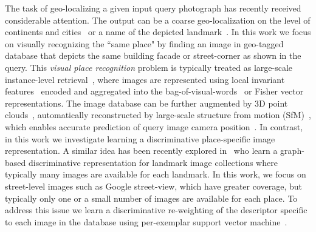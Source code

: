                        
                       
    
		\textcolor{petr}{
	The task of geo-localizing a given input query photograph has recently received considerable attention.  
	  The output can be a coarse geo-localization on the level of continents and cities~\cite{Doersch12,Hays2008,Kalogerakis09} or a name of the depicted landmark~\cite{Li09}.  In this work we focus on visually recognizing the ``same place" by finding an image in geo-tagged database that depicts the same building facade or street-corner as shown in the query.}  	  
    This {\em visual place recognition} problem is typically treated as large-scale instance-level retrieval~\cite{Cummins09,Chen11,Knopp2010,Schindler07,Torii2013,Zamir10}, where images are represented using local invariant features~\cite{Lowe04} encoded and aggregated into the bag-of-visual-words~\cite{Csurka04,Sivic03} or Fisher vector~\cite{Jegou12} representations. 
    The image database can be further augmented by 3D point clouds~\cite{Klinger13}, automatically
    reconstructed by large-scale structure from motion
    (SfM)~\cite{Agarwal-ICCV-2009,Klinger13}, which enables accurate prediction of query image camera position~\cite{Li12,Sattler12}.
    In contrast, in this work we investigate learning a discriminative place-specific image representation. A similar idea has been recently explored in~\cite{Cao13} 
    who learn a graph-based discriminative representation for landmark image collections where typically many images are available for each landmark.
    In this work, we focus on street-level images such as Google street-view, which have greater coverage, but typically only one or a small number of images are  available for each place.  To address this issue we learn a discriminative re-weighting of the descriptor specific to each image in the database using per-exemplar support vector machine~\cite{Malisiewicz11}.
    
